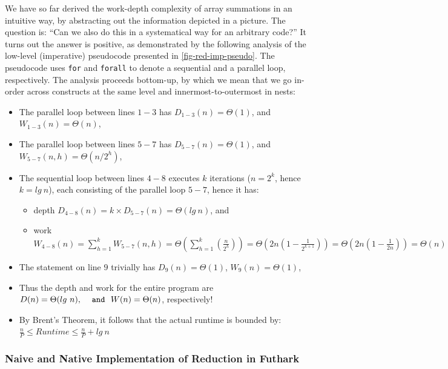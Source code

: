 \documentclass[acmsmall,review]{acmart}\settopmatter{printfolios=true,printccs=false,printacmref=false}
\begin{document}
We have so far derived the work-depth complexity of array summations
in an intuitive way, by abstracting out the information depicted in 
a picture.   The question is: ``Can we also do this in a systematical
way for an arbitrary code?'' It turns out the answer is positive,
as demonstrated by the following analysis of the low-level (imperative)
pseudocode presented in \cref{fig-red-imp-pseudo}. The pseudocode
uses \lstinline{for} and \lstinline{forall} to denote a sequential and
a parallel loop, respectively. The analysis
proceeds bottom-up, by which we mean that we go in-order across
constructs at the same level and innermost-to-outermost in
nests:

\begin{itemize}
    \item The parallel loop between lines $1-3$ has 
            $D_{1-3}(n) = \Theta(1)$, and $W_{1-3}(n) = \Theta(n)$,
    \item The parallel loop between lines $5-7$ has
            $D_{5-7}(n) = \Theta(1)$, and $W_{5-7}(n,h) = \Theta(n/2^h)$,
    \item The sequential loop between lines $4-8$ executes $k$ 
            iterations ($n = 2^k$, hence $k = lg \ n$), each 
            consisting of the parallel loop $5-7$, 
            hence it has:
        \begin{itemize}
           \item depth $D_{4-8}(n) = k \times D_{5-7}(n) = \Theta(lg \ n)$, and
           \item work $W_{4-8}(n) = \sum_{h=1}^k W_{5-7}(n,h) = \Theta(\sum_{h=1}^k (\frac{n}{2^h}) ) = \Theta(2 n (1 - \frac{1}{2^{k+1}}) ) = \Theta(2 n (1 - \frac{1}{2 n}) ) = \Theta(n)$
        \end{itemize}
    \item The statement on line $9$ trivially has $D_{9}(n) = \Theta(1)$, $W_{9}(n) = \Theta(1)$,\bigskip
    \item Thus the depth and work for the entire program are
        \emph{$D(n) = \Theta(lg \ n), ~~\mbox{\tt and}~~ W(n) = \Theta(n)$}, respectively!
    \item By Brent's Theorem, it follows that the actual runtime is bounded by:
            $\frac{n}{P} \leq Runtime \leq \frac{n}{P} + lg \ n$
\end{itemize}

\subsubsection{Naive and Native Implementation of Reduction in Futhark}
\label{subsubsub:work-depth}
$\mbox{ }$\\
\end{document}

